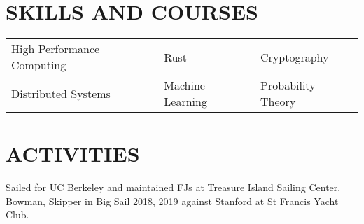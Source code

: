 \documentclass[10pt]{article}
\begin{document}
\section*{SKILLS AND COURSES}

				\setlength{\columnsep}{.5pt}
				\begin{tabu}{X[2c]X[2c]X[2c]}
					High Performance Computing & Rust                 & Cryptography \\
					Distributed Systems  & Machine Learning	 & Probability Theory  \\
				\end{tabu}
 

\section*{ACTIVITIES}

        {Sailed for UC Berkeley and maintained FJs at Treasure Island Sailing Center. 
        Bowman, Skipper in Big Sail 2018, 2019 against Stanford at St Francis Yacht Club.}
\end{document}
